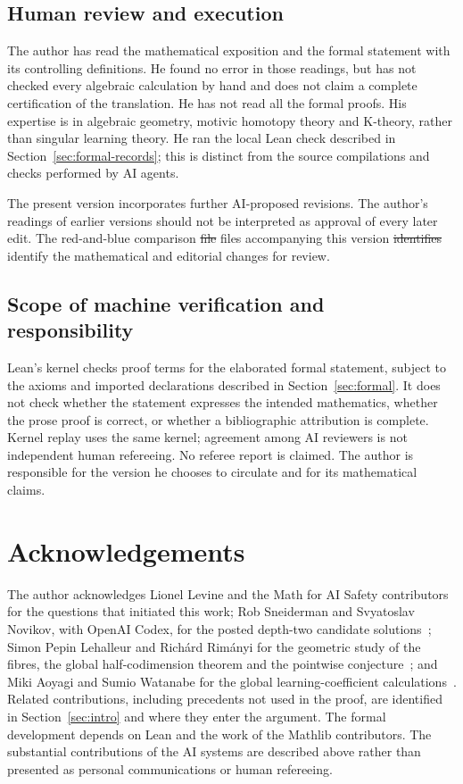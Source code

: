 \documentclass[11pt,a4paper]{article}
\theoremstyle{definition}
\theoremstyle{remark}
\numberwithin{equation}{section}
\providecommand{\DIFaddtex}[1]{{\protect\color{blue}#1}} %
\providecommand{\DIFdeltex}[1]{{\protect\color{red}\sout{#1}}} %
\providecommand{\DIFaddbegin}{} %
\providecommand{\DIFaddend}{} %
\providecommand{\DIFdelbegin}{} %
\providecommand{\DIFdelend}{} %
\providecommand{\DIFadd}[1]{\texorpdfstring{\DIFaddtex{#1}}{#1}} %
\providecommand{\DIFdel}[1]{\texorpdfstring{\DIFdeltex{#1}}{}} %
\begin{document}
\subsection*{Human review and execution}
The author has read the mathematical exposition and the formal statement with its controlling definitions. He found no error in those readings, but has not checked every algebraic calculation by hand and does not claim a complete certification of the translation. He has not read all the formal proofs. His expertise is in algebraic geometry, motivic homotopy theory and K-theory, rather than singular learning theory. He ran the local Lean check described in Section~\ref{sec:formal-records}; this is distinct from the source compilations and checks performed by AI agents.

The present version incorporates further AI-proposed revisions. The author's readings of earlier versions should not be interpreted as approval of every later edit. The red-and-blue comparison \DIFdelbegin \DIFdel{file }\DIFdelend \DIFaddbegin \DIFadd{files }\DIFaddend accompanying this version \DIFdelbegin \DIFdel{identifies }\DIFdelend \DIFaddbegin \DIFadd{identify }\DIFaddend the mathematical and editorial changes for review.

\subsection*{Scope of machine verification and responsibility}
Lean's kernel checks proof terms for the elaborated formal statement, subject to the axioms and imported declarations described in Section~\ref{sec:formal}. It does not check whether the statement expresses the intended mathematics, whether the prose proof is correct, or whether a bibliographic attribution is complete. Kernel replay uses the same kernel; agreement among AI reviewers is not independent human refereeing. No referee report is claimed. The author is responsible for the version he chooses to circulate and for its mathematical claims.

\section*{Acknowledgements}
The author acknowledges Lionel Levine and the Math for AI Safety contributors for the questions that initiated this work; Rob Sneiderman and Svyatoslav Novikov, with OpenAI Codex, for the posted depth-two candidate solutions~\cite{mais-issue-3,mais-issue-12}; Simon Pepin Lehalleur and Richárd Rimányi for the geometric study of the fibres, the global half-codimension theorem and the pointwise conjecture~\cite{lehalleur-rimanyi}; and Miki Aoyagi and Sumio Watanabe for the global learning-coefficient calculations~\cite{aoyagi-watanabe,aoyagi-2024}. Related contributions, including precedents not used in the proof, are identified in Section~\ref{sec:intro} and where they enter the argument. The formal development depends on Lean and the work of the Mathlib contributors. The substantial contributions of the AI systems are described above rather than presented as personal communications or human refereeing.
\appendix
\end{document}
